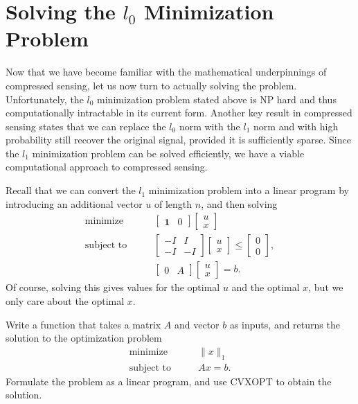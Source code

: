 \section*{Solving the $l_0$ Minimization Problem}
Now that we have become familiar with the mathematical underpinnings of compressed sensing, let us now turn to
actually solving the problem. Unfortunately, the $l_0$ minimization problem stated above is NP hard and thus
computationally intractable in its current form. Another key result in compressed sensing states that we can
replace the $l_0$ norm with the $l_1$ norm and with high probability still recover the original signal, provided
it is sufficiently sparse. Since the $l_1$ minimization problem can be solved efficiently, we have a viable
computational approach to compressed sensing.

Recall that we can convert the $l_1$ minimization problem into a linear program by introducing an additional
vector $u$ of length $n$, and then solving
\begin{align*}
\text{minimize}\qquad
&\begin{bmatrix}
\mathbf{1} & 0
\end{bmatrix}
\begin{bmatrix}
u \\
x
\end{bmatrix}\\
\text{subject to}\qquad
&\begin{bmatrix}
-I & I\\
-I & -I
\end{bmatrix}
\begin{bmatrix}
u \\
x
\end{bmatrix}
\leq
\begin{bmatrix}
0\\
0
\end{bmatrix},\\
&\begin{bmatrix}
0 & A
\end{bmatrix}
\begin{bmatrix}
u \\
x
\end{bmatrix}
=
b.
\end{align*}
Of course, solving this gives values for the optimal $u$ and the optimal $x$, but we only care about the optimal $x$.

\begin{problem}
Write a function  that takes a matrix $A$ and vector $b$ as inputs, and returns the solution to the
optimization problem
\begin{align*}
\text{minimize}\qquad &\|x\|_1\\
\text{subject to} \qquad &Ax = b.
\end{align*}
Formulate the problem as a linear program, and use CVXOPT to obtain the solution.
\end{problem}

